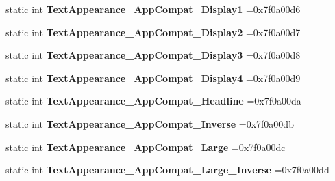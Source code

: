 \begin{DoxyCompactItemize}
static int {\bfseries Text\+Appearance\+\_\+\+App\+Compat\+\_\+\+Display1} =0x7f0a00d6
\item 
\mbox{\label{classandroid_1_1support_1_1v7_1_1mediarouter_1_1R_1_1style_a1c27c5bfc37136563fb162cc4ec8a610}} 
static int {\bfseries Text\+Appearance\+\_\+\+App\+Compat\+\_\+\+Display2} =0x7f0a00d7
\item 
\mbox{\label{classandroid_1_1support_1_1v7_1_1mediarouter_1_1R_1_1style_aaf1fbb44f5183c49e3524e47c7c8502a}} 
static int {\bfseries Text\+Appearance\+\_\+\+App\+Compat\+\_\+\+Display3} =0x7f0a00d8
\item 
\mbox{\label{classandroid_1_1support_1_1v7_1_1mediarouter_1_1R_1_1style_a81e00ff7643d4f4b8e86cede2fa83fee}} 
static int {\bfseries Text\+Appearance\+\_\+\+App\+Compat\+\_\+\+Display4} =0x7f0a00d9
\item 
\mbox{\label{classandroid_1_1support_1_1v7_1_1mediarouter_1_1R_1_1style_a029723214f4e99175f8d2b3917bb945b}} 
static int {\bfseries Text\+Appearance\+\_\+\+App\+Compat\+\_\+\+Headline} =0x7f0a00da
\item 
\mbox{\label{classandroid_1_1support_1_1v7_1_1mediarouter_1_1R_1_1style_a3c24817f18496323d4d4e5f56f25fe27}} 
static int {\bfseries Text\+Appearance\+\_\+\+App\+Compat\+\_\+\+Inverse} =0x7f0a00db
\item 
\mbox{\label{classandroid_1_1support_1_1v7_1_1mediarouter_1_1R_1_1style_a5808f9a148fe16a71efb6b2ad26ea066}} 
static int {\bfseries Text\+Appearance\+\_\+\+App\+Compat\+\_\+\+Large} =0x7f0a00dc
\item 
\mbox{\label{classandroid_1_1support_1_1v7_1_1mediarouter_1_1R_1_1style_a9498f29efa7f7d5f2d87739be58b42f9}} 
static int {\bfseries Text\+Appearance\+\_\+\+App\+Compat\+\_\+\+Large\+\_\+\+Inverse} =0x7f0a00dd
\item 
\mbox{\label{classandroid_1_1support_1_1v7_1_1mediarouter_1_1R_1_1style_a6a5d09dda2fd8b73af43105bd47a8df0}} 

\end{DoxyCompactItemize}
